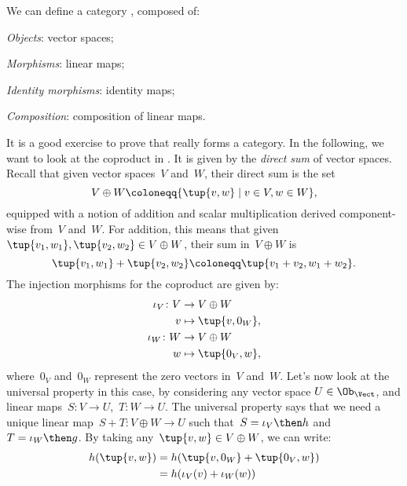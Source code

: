 \begin{example}
We can define a category \iindex{\Vect}, composed of:
\begin{compactitem}
\item \emph{Objects}: vector spaces;
\item \emph{Morphisms}: linear maps;
\item \emph{Identity morphisms}: identity maps;
\item \emph{Composition}: composition of linear maps.
\end{compactitem}
It is a good exercise to prove that \Vect really forms a category. In the following, we want to look at the coproduct in \Vect. It is given by the \emph{direct sum} of vector spaces. Recall that given vector spaces~$V$ and~$W$, their direct sum is the set
\begin{equation*}
    V\oplus W\coloneqq \{\tup{v,w}\mid v\in V,w\in W\},
\end{equation*}
equipped with a notion of addition and scalar multiplication derived component-wise from~$V$ and~$W$. For addition, this means that given~$\tup{v_1,w_1},\tup{v_2,w_2}\in V\oplus W$, their sum in~$V \oplus W$ is
\begin{equation*}
    \tup{v_1,w_1}+\tup{v_2,w_2}\coloneqq \tup{v_1+v_2,w_1+w_2}.
\end{equation*}
The injection morphisms for the coproduct are given by:
\begin{equation*}
    \begin{aligned}
    \iota_V\colon V&\to V\oplus W\\
    v&\mapsto \tup{v,0_W},\\
    \iota_W\colon W&\to V\oplus W\\
    w&\mapsto \tup{0_V,w},
    \end{aligned}
\end{equation*}
where~$0_V$ and~$0_W$ represent the zero vectors in~$V$ and~$W$. Let's now look at the universal property in this case, by considering any vector space $U\in \Ob_\Vect$, and linear maps~$S\colon V\to U$,~$T\colon W\to U$. The universal property says that we need a unique linear map~$S+T\colon V\oplus W \to U$ such that~$S=\iota_V\then h$ and~$T=\iota_W\then g$. By taking any~$\tup{v,w}\in V\oplus W$, we can write:
\begin{equation*}
    \begin{aligned}
    h(\tup{v,w})&=h(\tup{v,0_W}+\tup{0_V,w})\\
    &=h(\iota_V(v)+\iota_W(w)) \\

\end{aligned}
\end{equation*}
\end{example}
